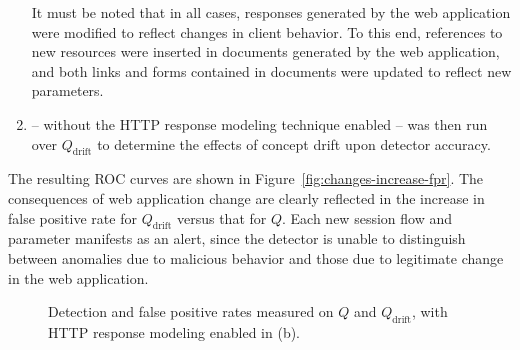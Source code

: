 \begin{enumerate}
It must be noted that in all cases, responses generated by the web application were modified to reflect changes in client behavior.  To this end, references to new resources were inserted in documents generated by the web application, and both links and forms contained in documents were updated to reflect new parameters.

\item \webanomaly -- without the \ac{HTTP} response modeling technique enabled -- was then run over $Q_{\text{drift}}$ to determine the effects of concept drift upon detector accuracy.
\end{enumerate}

The resulting \ac{ROC} curves are shown in Figure~\ref{fig:changes-increase-fpr}.  The consequences of web application change are clearly reflected in the increase in false positive rate for $Q_{\text{drift}}$ versus that for $Q$.  Each new session flow and parameter manifests as an alert, since the detector is unable to distinguish between anomalies due to malicious behavior and those due to legitimate change in the web application.

\begin{figure}[t]
  \centering

  \caption{Detection and false positive rates measured on $Q$ and $Q_{\text{drift}}$, with \ac{HTTP} response modeling enabled in (b).}
\end{figure}

